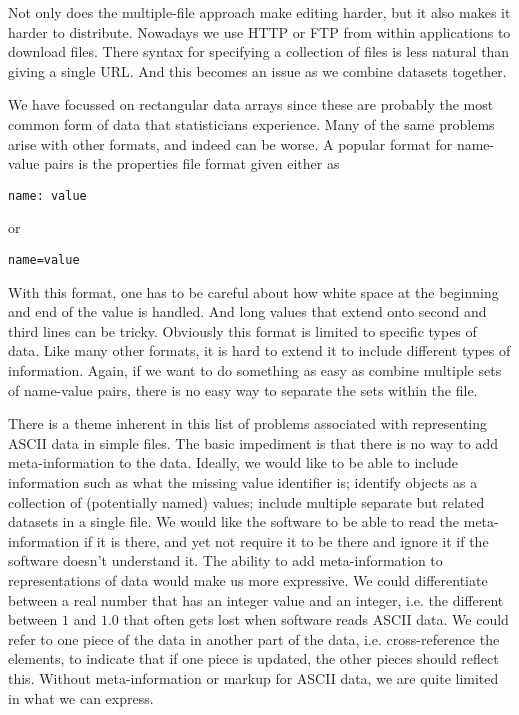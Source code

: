 Not only does the multiple-file approach make editing harder, but it
also makes it harder to distribute.  Nowadays we use HTTP or FTP from
within applications to download files. There syntax for specifying a
collection of files is less natural than giving a single URL.  And
this becomes an issue as we combine datasets together. 

We have focussed on rectangular data arrays since these are probably
the most common form of data that statisticians experience.  Many of
the same problems arise with other formats, and indeed can be worse.
A popular format for name-value pairs is the properties file format 
given either as
\begin{verbatim}
name: value
\end{verbatim}
or
\begin{verbatim}
name=value
\end{verbatim}
With this format, one has to be careful about how white space at the beginning and end
of the value is handled.  And long values that extend onto second and
third lines can be tricky.  Obviously this format is limited to
specific types of data. Like many other formats, it is hard to extend
it to include different types of information.  Again, if we want to do
something as easy as combine multiple sets of name-value pairs, there
is no easy way to separate the sets within the file.

There is a theme inherent in this list of problems associated with
representing ASCII data in simple files.  The basic impediment is that
there is no way to add meta-information to the data.  Ideally, we
would like to be able to include information such as what the missing
value identifier is; identify objects as a collection of (potentially
named) values; include multiple separate but related datasets in a
single file.  We would like the software to be able to read the
meta-information if it is there, and yet not require it to be there
and ignore it if the software doesn't understand it.  The ability to
add meta-information to representations of data would make us more
expressive.  We could differentiate between a real number that has an
integer value and an integer, i.e. the different between $1$ and $1.0$
that often gets lost when software reads ASCII data.  We could refer
to one piece of the data in another part of the data, i.e.
cross-reference the elements, to indicate that if one piece is
updated, the other pieces should reflect this.  Without
meta-information or markup for ASCII data, we are quite limited in
what we can express.


